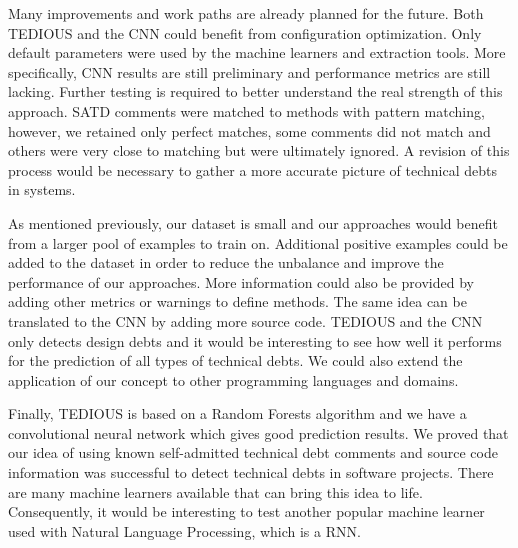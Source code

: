 Many improvements and work paths are already planned for the future. Both TEDIOUS and the CNN could benefit from configuration optimization. Only default parameters were used by the machine learners and extraction tools. More specifically, CNN results are still preliminary and performance metrics are still lacking. Further testing is required to better understand the real strength of this approach. SATD comments were matched to methods with pattern matching, however, we retained only perfect matches, some comments did not match and others were very close to matching but were ultimately ignored. A revision of this process would be necessary to gather a more accurate picture of technical debts in systems.

As mentioned previously, our dataset is small and our approaches would benefit from a larger pool of examples to train on. Additional positive examples could be added to the dataset in order to reduce the unbalance and improve the performance of our approaches. More information could also be provided by adding other metrics or warnings to define methods. The same idea can be translated to the CNN by adding more source code. TEDIOUS and the CNN only detects design debts and it would be interesting to see how well it performs for the prediction of all types of technical debts. We could also extend the application of our concept to other programming languages and domains.

Finally, TEDIOUS is based on a Random Forests algorithm and we have a convolutional neural network which gives good prediction results. We proved that our idea of using known self-admitted technical debt comments and source code information was successful to detect technical debts in software projects. There are many machine learners available that can bring this idea to life. Consequently, it would be interesting to test another popular machine learner used with Natural Language Processing, which is a \ac{RNN}.




















